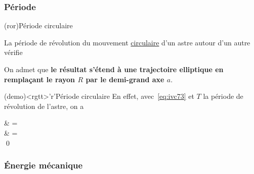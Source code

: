 \documentclass[../../main/main.tex]{subfiles}
\begin{document}
\subsubsection{Période}

\begin{tcbraster}[raster equal height=rows, raster columns=2]
  \begin{tcb*}(ror){Période circulaire}
    \begin{bfseries}
      La période de révolution du mouvement \ul{circulaire} d'un astre
      autour d'un autre vérifie
      \psw{\[\boxed{\frac{T^2}{R^3} = \frac{4\pi^2}{\Gc M_S}}\]}
    \end{bfseries}
    \vspace{-15pt}
    \tcblower
    On admet que \textbf{le résultat s'étend à une trajectoire elliptique en
      remplaçant le rayon $R$ par le demi-grand axe $a$}.
  \end{tcb*}
  \begin{tcb*}(demo)<rgtt>'r'{Période circulaire}
    En effet, avec~\eqref{eq:ivc73} et $T$ la période de révolution de l'astre,
    on a
  \begin{DispWithArrows*}
    \psw{\tp}                     & = 
    \\\Lra
          & = 
    \\\Lra
    \qed
  \end{DispWithArrows*}
  \end{tcb*}
\end{tcbraster}

\subsubsection{Énergie mécanique}
\end{document}
